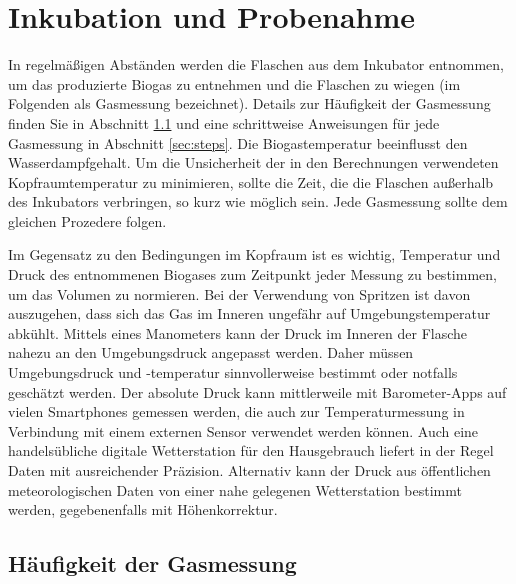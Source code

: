 \documentclass[]{article}
\begin{document}
\section{Inkubation und Probenahme}
\label{sec:incsam}
In regelmäßigen Abständen werden die Flaschen aus dem Inkubator entnommen, um das produzierte Biogas zu entnehmen und die Flaschen zu wiegen (im  Folgenden als \glqq Gasmessung\grqq{} bezeichnet).
Details zur Häufigkeit der Gasmessung finden Sie in Abschnitt \ref{sec:freq} und eine schrittweise Anweisungen für jede Gasmessung in Abschnitt \ref{sec:steps}.
Die Biogastemperatur beeinflusst den Wasserdampfgehalt.
Um die Unsicherheit der in den Berechnungen verwendeten Kopfraumtemperatur zu minimieren, sollte die Zeit, die die Flaschen außerhalb des Inkubators verbringen, so kurz wie möglich sein. Jede Gasmessung sollte dem gleichen Prozedere folgen.

Im Gegensatz zu den Bedingungen im Kopfraum ist es wichtig,  Temperatur und Druck des entnommenen Biogases zum Zeitpunkt jeder Messung zu bestimmen, um das Volumen zu normieren.
Bei der Verwendung von Spritzen ist davon auszugehen, dass sich das Gas im Inneren ungefähr auf Umgebungstemperatur abkühlt.
Mittels eines Manometers kann der Druck im Inneren der Flasche nahezu an den Umgebungsdruck angepasst werden.
Daher müssen Umgebungsdruck und -temperatur sinnvollerweise bestimmt oder notfalls geschätzt werden.
Der absolute Druck kann mittlerweile mit Barometer-Apps auf vielen Smartphones gemessen werden, die auch zur Temperaturmessung in Verbindung mit einem externen Sensor verwendet werden können. Auch eine handelsübliche digitale Wetterstation für den Hausgebrauch liefert in der Regel Daten mit ausreichender Präzision.
Alternativ kann der Druck aus öffentlichen meteorologischen Daten von einer nahe gelegenen Wetterstation bestimmt werden, gegebenenfalls mit Höhenkorrektur.

\subsection{Häufigkeit der Gasmessung}
\label{sec:freq}
\end{document}
